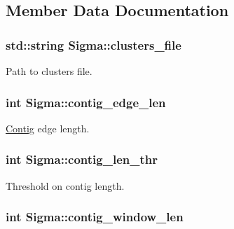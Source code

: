 \subsection{Member Data Documentation}
\hypertarget{classSigma_a31669f94dd223ec178a1bdb7b818517b}{
\subsubsection[{clusters\_\-file}]{\setlength{\rightskip}{0pt plus 5cm}std::string {\bf Sigma::clusters\_\-file}}}
\label{classSigma_a31669f94dd223ec178a1bdb7b818517b}
Path to clusters file. \hypertarget{classSigma_aa38e6db83d0cc7fb63dba03eb157c522}{
\subsubsection[{contig\_\-edge\_\-len}]{\setlength{\rightskip}{0pt plus 5cm}int {\bf Sigma::contig\_\-edge\_\-len}}}
\label{classSigma_aa38e6db83d0cc7fb63dba03eb157c522}
\hyperlink{classContig}{Contig} edge length. \hypertarget{classSigma_aed71635cf9007c2df2c869dac627aa63}{
\subsubsection[{contig\_\-len\_\-thr}]{\setlength{\rightskip}{0pt plus 5cm}int {\bf Sigma::contig\_\-len\_\-thr}}}
\label{classSigma_aed71635cf9007c2df2c869dac627aa63}
Threshold on contig length. \hypertarget{classSigma_a388ca75430d14e589b9e99933973b454}{
\subsubsection[{contig\_\-window\_\-len}]{\setlength{\rightskip}{0pt plus 5cm}int {\bf Sigma::contig\_\-window\_\-len}}}
